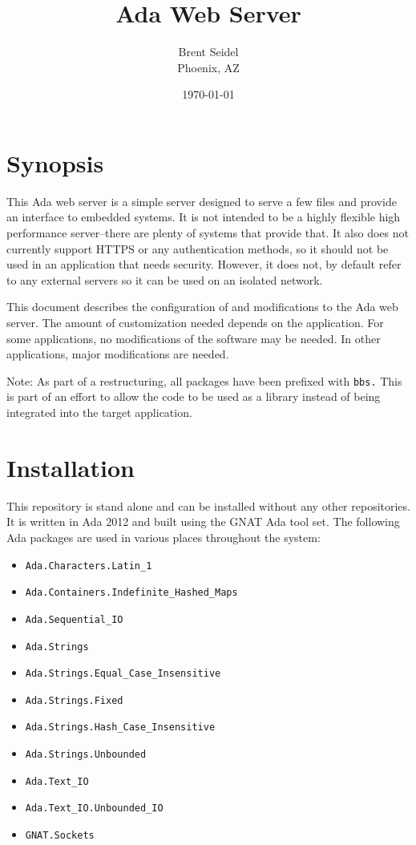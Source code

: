 \documentclass[10pt, openany, draft]{article}
\title{Ada Web Server}
\author{Brent Seidel \\ Phoenix, AZ}
\date{ \today }
\begin{document}
\maketitle
\section{Synopsis}
This Ada web server is a simple server designed to serve a few files and provide an interface to embedded systems.  It is not intended to be a highly flexible high performance server--there are plenty of systems that provide that.  It also does not currently support HTTPS or any authentication methods, so it should not be used in an application that needs security.  However, it does not, by default refer to any external servers so it can be used on an isolated network.

This document describes the configuration of and modifications to the Ada web server.  The amount of customization needed depends on the application.  For some applications, no modifications of the software may be needed.  In other applications, major modifications are needed.

Note: As part of a restructuring, all packages have been prefixed with \texttt{bbs.}  This is part of an effort to allow the code to be used as a library instead of being integrated into the target application.

\section{Installation}
This repository is stand alone and can be installed without any other repositories.  It is written in Ada 2012 and built using the GNAT Ada tool set.  The following Ada packages are used in various places throughout the system:
\begin{itemize}
  \item \verb|Ada.Characters.Latin_1|
  \item \verb|Ada.Containers.Indefinite_Hashed_Maps|
  \item \verb|Ada.Sequential_IO|
  \item \verb|Ada.Strings|
  \item \verb|Ada.Strings.Equal_Case_Insensitive|
  \item \verb|Ada.Strings.Fixed|
  \item \verb|Ada.Strings.Hash_Case_Insensitive|
  \item \verb|Ada.Strings.Unbounded|
  \item \verb|Ada.Text_IO|
  \item \verb|Ada.Text_IO.Unbounded_IO|
  \item \verb|GNAT.Sockets|
\end{itemize}
\end{document}
